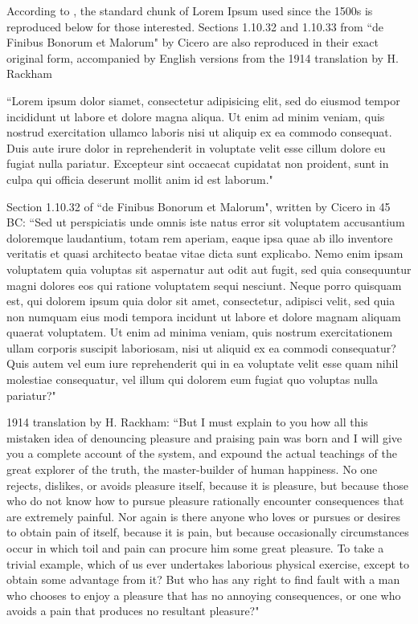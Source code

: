   According to \citet{Ortiz-Vidal2017}, the standard chunk of Lorem Ipsum used since the 1500s is reproduced below for those interested. Sections 1.10.32 and 1.10.33 from ``de Finibus Bonorum et Malorum" by Cicero are also reproduced in their exact original form, accompanied by English versions from the 1914 translation by H. Rackham

  ``Lorem ipsum dolor siamet, consectetur adipisicing elit, sed do eiusmod tempor incididunt ut labore et dolore magna aliqua. Ut enim ad minim veniam, quis nostrud exercitation ullamco laboris nisi ut aliquip ex ea commodo consequat. Duis aute irure dolor in reprehenderit in voluptate velit esse cillum dolore eu fugiat nulla pariatur. Excepteur sint occaecat cupidatat non proident, sunt in culpa qui officia deserunt mollit anim id est laborum."

  Section 1.10.32 of ``de Finibus Bonorum et Malorum", written by Cicero in 45 BC: ``Sed ut perspiciatis unde omnis iste natus error sit voluptatem accusantium doloremque laudantium, totam rem aperiam, eaque ipsa quae ab illo inventore veritatis et quasi architecto beatae vitae dicta sunt explicabo. Nemo enim ipsam voluptatem quia voluptas sit aspernatur aut odit aut fugit, sed quia consequuntur magni dolores eos qui ratione voluptatem sequi nesciunt. Neque porro quisquam est, qui dolorem ipsum quia dolor sit amet, consectetur, adipisci velit, sed quia non numquam eius modi tempora incidunt ut labore et dolore magnam aliquam quaerat voluptatem. Ut enim ad minima veniam, quis nostrum exercitationem ullam corporis suscipit laboriosam, nisi ut aliquid ex ea commodi consequatur? Quis autem vel eum iure reprehenderit qui in ea voluptate velit esse quam nihil molestiae consequatur, vel illum qui dolorem eum fugiat quo voluptas nulla pariatur?"

  1914 translation by H. Rackham: ``But I must explain to you how all this mistaken idea of denouncing pleasure and praising pain was born and I will give you a complete account of the system, and expound the actual teachings of the great explorer of the truth, the master-builder of human happiness. No one rejects, dislikes, or avoids pleasure itself, because it is pleasure, but because those who do not know how to pursue pleasure rationally encounter consequences that are extremely painful. Nor again is there anyone who loves or pursues or desires to obtain pain of itself, because it is pain, but because occasionally circumstances occur in which toil and pain can procure him some great pleasure. To take a trivial example, which of us ever undertakes laborious physical exercise, except to obtain some advantage from it? But who has any right to find fault with a man who chooses to enjoy a pleasure that has no annoying consequences, or one who avoids a pain that produces no resultant pleasure?"


